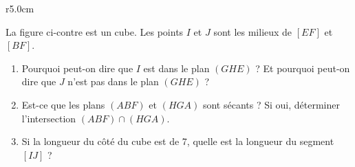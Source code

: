 
\begin{exercice}\label{exosmath-0600}

\begin{wrapfigure}{r}{5.0cm}
   \vspace{-0.5cm}        %
   \centering
   
\end{wrapfigure}

La figure ci-contre est un cube. Les points \( I\) et \( J\) sont les milieux de \( [EF]\) et \( [BF]\).
\begin{enumerate}
    \item
        Pourquoi peut-on dire que \( I\) est dans le plan \( (GHE)\) ? Et pourquoi peut-on dire que \( J\) n'est pas dans le plan \( (GHE)\) ?
    \item
        Est-ce que les plans \( (ABF) \) et \( (HGA)\) sont sécants ? Si oui, déterminer l'intersection \( (ABF)\cap (HGA)\).
    \item
        Si la longueur du côté du cube est de \unit{7}{\kilo\meter}, quelle est la longueur du segment \( [IJ]\) ?
\end{enumerate}

\end{exercice}
